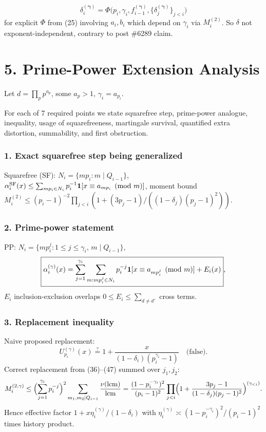 \documentclass[11pt,a4paper]{article}
\theoremstyle{plain}
\theoremstyle{definition}
\theoremstyle{remark}
\begin{document}
\[
\delta_{i}^{(\boldsymbol\gamma)}=\Phi\!\bigl(p_{i},\gamma_{i},f_{i-1}^{(\boldsymbol\gamma)},\{\delta_{j}^{(\boldsymbol\gamma)}\}_{j<i}\bigr)
\]
for explicit $\Phi$ from (25) involving $a_{i},b_{i}$ which depend on $\gamma_{i}$ via $M_{i}^{(2)}$. So $\delta$ not exponent-independent, contrary to post \#6289 claim.

\section{5. Prime-Power Extension Analysis}

Let $d=\prod_{p}p^{a_{p}}$, some $a_{p}>1$, $\gamma_{i}=a_{p_{i}}$.

For each of 7 required points we state squarefree step, prime-power analogue, inequality, usage of squarefreeness, martingale survival, quantified extra distortion, summability, and first obstruction.

\subsubsection*{1. Exact squarefree step being generalized}

Squarefree (SF): $N_{i}=\{mp_{i}:m\mid Q_{i-1}\}$, $\alpha_{i}^{\mathrm{SF}}(x)\le\sum_{mp_{i}\in N_{i}}p_{i}^{-1}{\bf1}[x\equiv a_{mp_{i}}\pmod m]$, moment bound $M_{i}^{(2)}\le(p_{i}-1)^{-2}\prod_{j<i}(1+(3p_{j}-1)/((1-\delta_{j})(p_{j}-1)^{2}))$.

\subsubsection*{2. Prime-power statement}

PP: $N_{i}=\{mp_{i}^{j}:1\le j\le\gamma_{i},\,m\mid Q_{i-1}\}$, 
\[
\boxed{\alpha_{i}^{(\gamma)}(x)=\sum_{j=1}^{\gamma_{i}}\sum_{m:mp_{i}^{j}\in N_{i}}p_{i}^{-j}{\bf1}[x\equiv a_{mp_{i}^{j}}\pmod m]+E_{i}(x)},
\]
$E_{i}$ inclusion-exclusion overlaps $0\le E_{i}\le\sum_{d\ne d'}$ cross terms.

\subsubsection*{3. Replacement inequality}

Naive proposed replacement:
\[
U_{p_{i}}^{(\gamma)}(x)\stackrel{?}{=}1+\frac{x}{(1-\delta_{i})(p_{i}^{\gamma_{i}}-1)}\quad\text{(false)}.
\]
Correct replacement from (36)--(47) summed over $j_{1},j_{2}$:
\[
M_{i}^{(2,{\gamma})}\le\Bigl(\sum_{j=1}^{\gamma_{i}}p_{i}^{-j}\Bigr)^{2}\sum_{m_{1},m_{2}\mid Q_{i-1}}\frac{\nu(\operatorname{lcm})}{\operatorname{lcm}}=\frac{(1-p_{i}^{-\gamma_{i}})^{2}}{(p_{i}-1)^{2}}\prod_{j<i}\Bigl(1+\frac{3p_{j}-1}{(1-\delta_{j})(p_{j}-1)^{2}}\Bigr)^{(\gamma_{<i})}.
\]
Hence effective factor $1+x\eta_{i}^{(\gamma)}/(1-\delta_{i})$ with $\eta_{i}^{(\gamma)}\asymp(1-p_{i}^{-\gamma_{i}})^{2}/(p_{i}-1)^{2}$ times history product.
\end{document}
